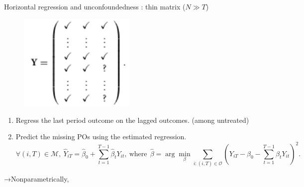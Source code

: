 \documentclass[xcolor=svgnames,aspectratio=169]{beamer}
\begin{document}
\begin{frame}{Horizontal regression and unconfoundedness : thin matrix ($N\gg T$)}
    \begin{figure}
            \includegraphics[width=0.5\textwidth, height=0.4\textheight, keepaspectratio]{Horizontal.png} 
        \end{figure}
    \begin{enumerate}
        \item Regress the last period outcome on the lagged outcomes. (among untreated)
        \item Predict the missing POs using the estimated regression.
        \[
        \forall (i,T)\in\mathcal{M} , \ \hat{Y}_{iT}=\hat{\beta}_0+\sum_{t=1}^{T-1}\hat{\beta}_tY_{it}, \ \text{where} \ \ \hat{\beta}=\arg\min_{\beta} \sum_{i:(i,T) \in \mathcal{O} }(Y_{iT}-\beta_0-\sum_{t=1}^{T-1}\beta_tY_{it})^2.
        \]
    \end{enumerate}
    →Nonparametrically, 
\end{frame}
\end{document}
